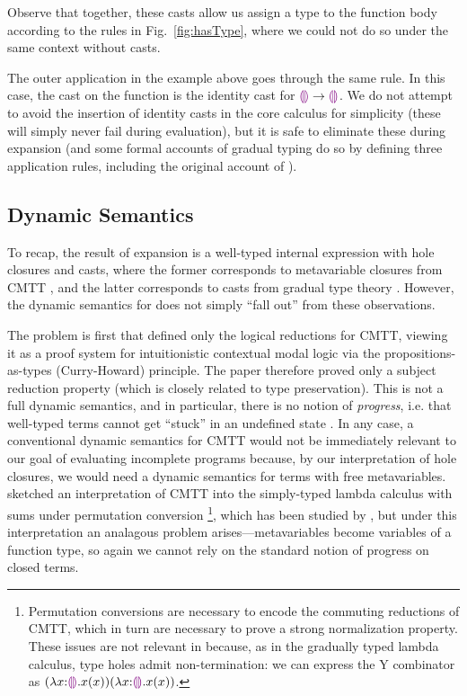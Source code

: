 Observe that together, these casts allow us assign a type to the function body according to the rules in Fig.~\ref{fig:hasType}, where we could not do so under the same context without casts.

The outer application in the example above goes through the same rule. 
In this case, the cast on the function is the identity cast for $\textcolor{violet}{\llparenthesis}\textcolor{violet}{\rrparenthesis} \rightarrow \textcolor{violet}{\llparenthesis}\textcolor{violet}{\rrparenthesis}$. 
We do not attempt to avoid the insertion of identity casts in the core calculus for simplicity (these will simply never fail during evaluation), 
but it is safe to eliminate these during expansion (and some formal accounts of gradual typing do so by defining three application rules, including the original account of \cite{Siek06a}).


\subsection{Dynamic Semantics}
\label{sec:evaluation}

To recap, the result of expansion is a well-typed internal expression with hole closures and casts, 
where the former corresponds to metavariable closures from CMTT \cite{Nanevski2008}, 
and the latter corresponds to casts from gradual type theory \cite{Siek06a,DBLP:conf/snapl/SiekVCB15}. 
However, the dynamic semantics for \HazelnutLive does not simply ``fall out'' from these observations. 

The problem is first that \citet{Nanevski2008} defined only the logical reductions for CMTT, viewing it as a proof system for intuitionistic contextual modal logic via the propositions-as-types (Curry-Howard) principle. 
The paper therefore proved only a subject reduction property (which is closely related to type preservation). 
This is not a full dynamic semantics, and in particular, there is no notion of \emph{progress}, i.e. that well-typed terms cannot get ``stuck'' in an undefined state \cite{wright94:_type_soundness}. 
In any case, a conventional dynamic semantics for CMTT would not be immediately relevant to our goal of evaluating incomplete programs because, by our interpretation of hole closures, we would need a dynamic semantics for terms with free metavariables. 
\citet{Nanevski2008} sketched an interpretation of CMTT into the simply-typed lambda calculus with sums under permutation conversion%
\footnote{Permutation conversions are necessary to encode the commuting reductions of CMTT, which in turn are necessary to prove a strong normalization property. These issues are not relevant in \HazelnutLive because, as in the gradually typed lambda calculus, type holes admit non-termination: we can express the Y combinator as $(\lambda x{:}\textcolor{violet}{\llparenthesis}\textcolor{violet}{\rrparenthesis}.x(x)) (\lambda x{:}\textcolor{violet}{\llparenthesis}\textcolor{violet}{\rrparenthesis}.x(x))$.}, 
which has been studied by \citet{DBLP:journals/iandc/Groote02}, 
but under this interpretation an analagous problem arises---metavariables become variables of a function type, so again we cannot rely on the standard notion of progress on closed terms.%

